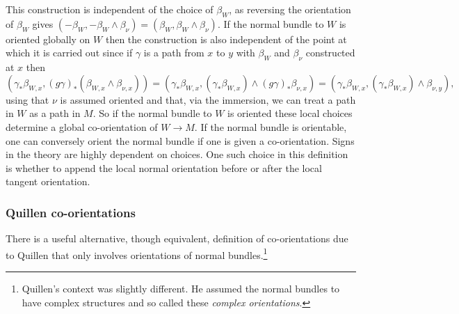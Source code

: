 This construction is independent of the choice of $\beta_W$, as reversing the orientation of $\beta_W$ gives $(-\beta_W, -\beta_W \wedge \beta_\nu)=(\beta_W, \beta_W \wedge \beta_\nu)$. If the normal bundle to $W$ is oriented globally on $W$ then the construction  is also independent of the point at which it is carried out since if $\gamma$ is a path from $x$ to $y$ with $\beta_W$ and $\beta_\nu$ constructed at $x$ then $$(\gamma_*\beta_{W,x},(g\gamma)_* ( \beta_{W,x} \wedge \beta_{\nu,x}))=(\gamma_*\beta_{W,x},(\gamma_* \beta_{W,x}) \wedge(g\gamma)_*\beta_{\nu,x})=(\gamma_*\beta_{W,x},(\gamma_* \beta_{W,x} )\wedge \beta_{\nu,y}),$$ using that $\nu$ is assumed oriented and that, via the immersion, we can treat a path in $W$ as a path in $M$.
So if the normal bundle to $W$ is oriented these local choices determine a global co-orientation of $W\to M$.  
If the normal bundle is orientable, one can conversely orient the normal bundle if one is given a co-orientation.   Signs in the theory are highly dependent on choices.  One such choice in this definition is  whether to append the local normal orientation before or after the local tangent orientation.  


\subsubsection{Quillen co-orientations} \label{S: Quillen}
There is a useful alternative, though equivalent, definition of co-orientations due to Quillen \cite{Quil71} that only involves orientations of normal bundles.\footnote{Quillen's context was slightly different. He assumed the normal bundles to have complex structures and so called these {\it complex orientations}.} 


